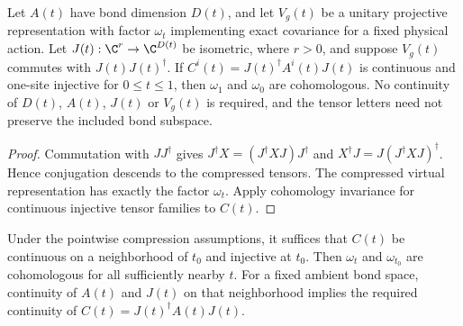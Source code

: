 \begin{lemma}
    \label{thm:spt_pointwise_invariant_compression}
    \leanok
    Let $A(t)$ have bond dimension $D(t)$, and let $V_g(t)$ be a unitary
    projective representation with factor $\omega_t$ implementing exact
    covariance for a fixed physical action. Let
    $J(t):\C^r\to\C^{D(t)}$ be isometric, where $r>0$, and suppose
    $V_g(t)$ commutes with $J(t)J(t)^\dagger$.
    If $C^i(t)=J(t)^\dagger A^i(t)J(t)$ is continuous and one-site
    injective for $0\leq t\leq1$, then $\omega_1$ and $\omega_0$ are
    cohomologous. No continuity of $D(t)$, $A(t)$, $J(t)$ or $V_g(t)$
    is required, and the tensor letters need not preserve the included
    bond subspace.
\end{lemma}

\begin{proof}\leanok
    Commutation with $JJ^\dagger$ gives
    $J^\dagger X=(J^\dagger XJ)J^\dagger$ and
    $X^\dagger J=J(J^\dagger XJ)^\dagger$. Hence conjugation descends
    to the compressed tensors. The compressed virtual representation
    has exactly the factor $\omega_t$. Apply cohomology invariance for
    continuous injective tensor families to $C(t)$.
\end{proof}

\begin{lemma}
    \label{thm:spt_local_invariant_compression}
    \leanok
    Under the pointwise compression assumptions, it suffices that $C(t)$
    be continuous on a neighborhood of $t_0$ and injective at $t_0$.
    Then $\omega_t$ and $\omega_{t_0}$ are cohomologous for all
    sufficiently nearby $t$. For a fixed ambient bond space,
    continuity of $A(t)$ and $J(t)$ on that neighborhood implies the
    required continuity of $C(t)=J(t)^\dagger A(t)J(t)$.
\end{lemma}

